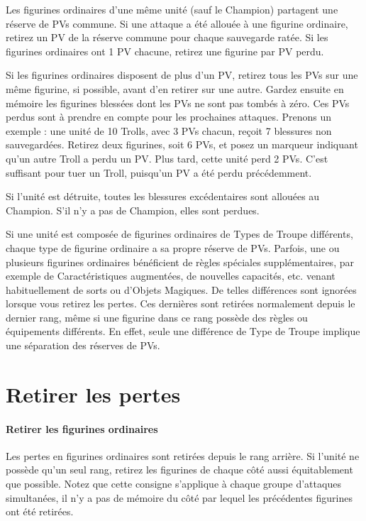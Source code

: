 Les figurines ordinaires d'une même unité (sauf le Champion) partagent une réserve de PVs commune. Si une attaque a été allouée à une figurine ordinaire, retirez un PV de la réserve commune pour chaque sauvegarde ratée. Si les figurines ordinaires ont 1 PV chacune, retirez une figurine par PV perdu.

Si les figurines ordinaires disposent de plus d'un PV, retirez tous les PVs sur une même figurine, si possible, avant d'en retirer sur une autre. Gardez ensuite en mémoire les figurines blessées dont les PVs ne sont pas tombés à zéro. Ces PVs perdus sont à prendre en compte pour les prochaines attaques. Prenons un exemple : une unité de 10 Trolls, avec 3 PVs chacun, reçoit 7 blessures non sauvegardées. Retirez deux figurines, soit 6 PVs, et posez un marqueur indiquant qu'un autre Troll a perdu un PV. Plus tard, cette unité perd 2 PVs. C'est suffisant pour tuer un Troll, puisqu'un PV a été perdu précédemment. 

Si l'unité est détruite, toutes les blessures excédentaires sont allouées au Champion. S'il n'y a pas de Champion, elles sont perdues.

Si une unité est composée de figurines ordinaires de Types de Troupe différents, chaque type de figurine ordinaire a sa propre réserve de PVs. Parfois, une ou plusieurs figurines ordinaires bénéficient de règles spéciales supplémentaires, par exemple de Caractéristiques augmentées, de nouvelles capacités, etc. venant habituellement de sorts ou d'Objets Magiques. De telles différences sont ignorées lorsque vous retirez les pertes. Ces dernières sont retirées normalement depuis le dernier rang, même si une figurine dans ce rang possède des règles ou équipements différents. En effet, seule une différence de Type de Troupe implique une séparation des réserves de PVs. 

\newpage
\hypertarget{removecasualties}{\section{Retirer les pertes}}

\paragraph{Retirer les figurines ordinaires}

Les pertes en figurines ordinaires sont retirées depuis le rang arrière. Si l'unité ne possède qu'un seul rang, retirez les figurines de chaque côté aussi équitablement que possible. Notez que cette consigne s'applique à chaque groupe d'attaques simultanées, il n'y a pas de \og mémoire \fg{} du côté par lequel les précédentes figurines ont été retirées.

